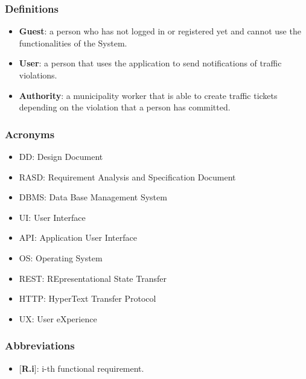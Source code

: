     \subsubsection{Definitions}
        \begin{itemize}
            \item \textbf{Guest}: a person who has not logged in or registered yet and cannot use the functionalities of the System.
            \item \textbf{User}: a person that uses the application to send notifications of traffic violations.
            \item \textbf{Authority}: a municipality worker that is able to create traffic tickets depending on the violation that a person has committed.
        \end{itemize}
        
    \subsubsection{Acronyms}
    \begin{itemize}
        \item DD: Design Document
        \item RASD: Requirement Analysis and Specification Document
        \item DBMS: Data Base Management System
        \item UI: User Interface
        \item API: Application User Interface
        \item OS: Operating System
        \item REST: REpresentational State Transfer
        \item HTTP: HyperText Transfer Protocol 
        \item UX: User eXperience
    \end{itemize}
    \subsubsection{Abbreviations}
        \begin{itemize}
            \item {[\textbf{R.i}]}: i-th functional requirement.
        \end{itemize}




